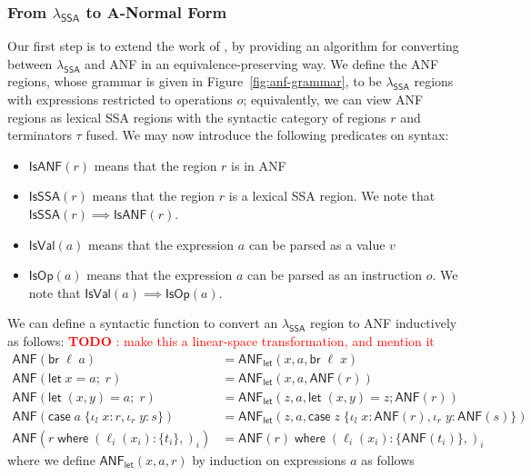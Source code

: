 \documentclass[acmsmall,screen,review]{acmart}
\newcounter{todos}
\newcommand{\todo}[1]{\stepcounter{todos} \textcolor{red}{\textbf{TODO \arabic{todos}}: #1}}
\newcommand{\ms}[1]{\ensuremath{\mathsf{#1}}}
\newcommand{\lto}{:}
\newcommand{\linl}[1]{\iota_l\;{#1}}
\newcommand{\linr}[1]{\iota_r\;{#1}}
\newcommand{\letexpr}[3]{\ensuremath{\ms{let}\;#1 = #2;\;#3}}
\newcommand{\letstmt}[3]{\ensuremath{\ms{let}\;#1 = #2; #3}}
\newcommand{\brb}[2]{\ms{br}\;#1\;#2}
\newcommand{\casestmt}[5]{\ms{case}\;#1\;\{\linl{#2} \lto #3, \linr{#4} \lto #5\}}
\newcommand{\where}[2]{#1\;\ms{where}\;#2}
\newcommand{\wbranch}[3]{#1(#2) \lto \{#3\}}
\newcommand{\toanf}[1]{\ms{ANF}(#1)}
\newcommand{\isanf}[1]{\ms{IsANF}(#1)}
\newcommand{\isvalex}[1]{\ms{IsVal}(#1)}
\newcommand{\isopex}[1]{\ms{IsOp}(#1)}
\newcommand{\isssa}[1]{\ms{IsSSA}(#1)}
\newcommand{\letanf}[3]{\ms{ANF}_{\ms{let}}(#1, #2, #3)}
\newcommand{\isotopessa}{\(\lambda_{\ms{SSA}}\)}
\begin{document}
\subsubsection{From \isotopessa{} to A-Normal Form}

Our first step is to extend the work of \citet{chakravarty-functional-ssa-2003}, by providing an
algorithm for converting between \isotopessa{} and ANF in an equivalence-preserving way. We define
the ANF regions, whose grammar is given in Figure~\ref{fig:anf-grammar}, to be \isotopessa{} regions
with expressions restricted to operations $o$; equivalently, we can view ANF regions as lexical SSA
regions with the syntactic category of regions $r$ and terminators $\tau$ fused. We may now
introduce the following predicates on syntax:
\begin{itemize}
  \item $\isanf{r}$ means that the region $r$ is in ANF
  \item $\isssa{r}$ means that the region $r$ is a lexical SSA region.  We note that $\isssa{r} \implies \isanf{r}$.
  \item $\isvalex{a}$ means that the expression $a$ can be parsed as a value $v$
  \item $\isopex{a}$ means that the expression $a$ can be parsed as an instruction $o$.
        We note that $\isvalex{a} \implies \isopex{a}$.
\end{itemize}
We can define a syntactic function to convert an \isotopessa{} region to ANF inductively as follows:
\todo{make this a linear-space transformation, and mention it}
\begin{equation}
  \begin{aligned}
    \toanf{\brb{\ell}{a}} &= \letanf{x}{a}{\brb{\ell}{x}} \\
    \toanf{\letexpr{x}{a}{r}} &= \letanf{x}{a}{\toanf{r}} \\
    \toanf{\letexpr{(x, y)}{a}{r}} &= \letanf{z}{a}{\letstmt{(x, y)}{z}{\toanf{r}}} \\
    \toanf{\casestmt{a}{x}{r}{y}{s}} &= \letanf{z}{a}{\casestmt{z}{x}{\toanf{r}}{y}{\toanf{s}}} \\
    \toanf{\where{r}{(\wbranch{\ell_i}{x_i}{t_i},)_i}}
      &= \where{\toanf{r}}{(\wbranch{\ell_i}{x_i}{\toanf{t_i}},)_i}
  \end{aligned}
\end{equation}
where we define $\letanf{x}{a}{r}$ by induction on expressions $a$ as follows
\end{document}
